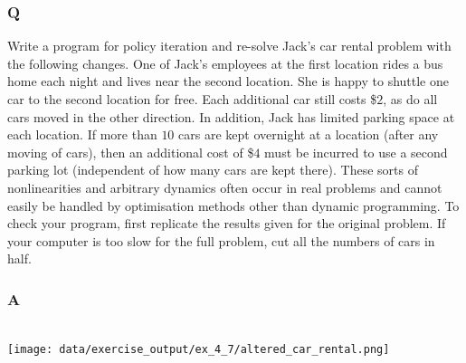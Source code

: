 \subsubsection{Q}
Write a program for policy iteration and re-solve Jack’s car rental problem with the following changes. One of Jack’s employees at the first location rides a bus home each night and lives near the second location. She is happy to shuttle one car to the second location for free. Each additional car still costs \$$2$, as do all cars moved in the other direction. In addition, Jack has limited parking space at each location. If more than $10$ cars are kept overnight at a location (after any moving of cars), then an additional cost of \$$4$ must be incurred to use a second parking lot (independent of how many cars are kept there). These sorts of nonlinearities and arbitrary dynamics often occur in real problems and cannot easily be handled by optimisation methods other than dynamic programming. To check your program, first replicate the results given for the original problem. If your computer is too slow for the full problem, cut all the numbers of cars in half.

\subsubsection{A}
\ProgrammingExercise\\
\texttt{[image: data/exercise\_output/ex\_4\_7/altered\_car\_rental.png]}



